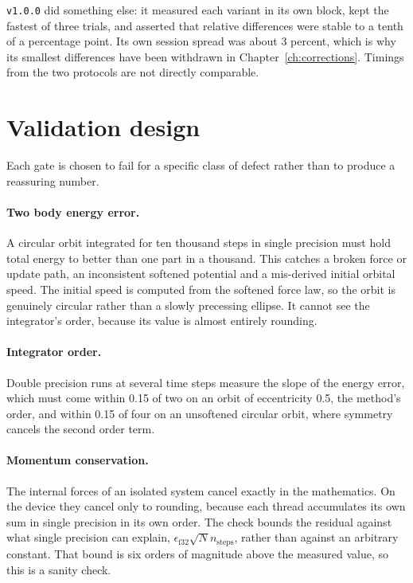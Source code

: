 \texttt{v1.0.0} did something else: it measured each variant in its own block, kept the
fastest of three trials, and asserted that relative differences were stable to a tenth of a
percentage point. Its own session spread was about 3 percent, which is why its smallest
differences have been withdrawn in Chapter~\ref{ch:corrections}. Timings from the two
protocols are not directly comparable.

\section{Validation design}

Each gate is chosen to fail for a specific class of defect rather than to
produce a reassuring number.

\paragraph{Two body energy error.} A circular orbit integrated for ten thousand
steps in single precision must hold total energy to better than one part in a thousand.
This catches a broken force or update path, an inconsistent softened potential and a
mis-derived initial orbital speed. The initial speed is computed from the softened force
law, so the orbit is genuinely circular rather than a slowly precessing ellipse. It cannot
see the integrator's order, because its value is almost entirely rounding.

\paragraph{Integrator order.} Double precision runs at several time steps measure the
slope of the energy error, which must come within 0.15 of two on an orbit of eccentricity
0.5, the method's order, and within 0.15 of four on an unsoftened circular orbit, where
symmetry cancels the second order term.

\paragraph{Momentum conservation.} The internal forces of an isolated system
cancel exactly in the mathematics. On the device they cancel only to rounding,
because each thread accumulates its own sum in single precision in its own
order. The check bounds the residual against what single precision can explain,
$\epsilon_{\mathrm{f32}} \sqrt{N} n_{\mathrm{steps}}$, rather than against an
arbitrary constant. That bound is six orders of magnitude above the measured value, so
this is a sanity check.

